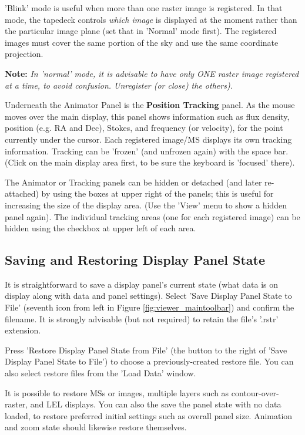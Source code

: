 'Blink' mode is useful when more than one raster image is
registered. In that mode, the tapedeck controls {\it which image} is
displayed at the moment rather than the particular image plane
(set that in 'Normal' mode first). The registered images must cover the
same portion of the sky and use the same coordinate projection.

{\bf Note:} {\em In 'normal' mode, it is advisable to have only ONE
raster image registered at a time, to avoid confusion. Unregister (or
close) the others).}

Underneath the Animator Panel is the {\bf Position Tracking} panel.  As
the mouse moves over the main display, this panel shows information such as
flux density, position (e.g. RA and Dec), Stokes, and frequency (or velocity),
for the point currently under the cursor.  Each registered image/MS displays
its own tracking information.  Tracking can be 'frozen' (and unfrozen again)
with the space bar.  (Click on the main display area first, to be sure the
keyboard is 'focused' there).

The Animator or Tracking panels can be hidden or detached (and later
re-attached) by using the boxes at upper right of the panels; this is
useful for increasing the size of the display area.  (Use the 'View'
menu to show a hidden panel again).  The individual tracking areas
(one for each registered image) can be hidden using the checkbox at
upper left of each area.


\subsection{Saving and Restoring Display Panel State}
\label{section:display.viewerGUI.save-restore}

It is straightforward to save a display panel's current state (what
data is on display along with data and panel settings).  Select 'Save Display
Panel State to File'
(seventh icon from left in Figure \ref{fig:viewer_maintoolbar})
and confirm the filename.  It is strongly
advisable (but not required) to retain the file's '.rstr' extension.  

Press 'Restore Display Panel State from File' (the button to the right
of 'Save Display Panel State to File') to
choose a previously-created restore file.  You can also select restore
files from the 'Load Data' window.

It is possible to restore MSs or images, multiple layers such as
contour-over-raster, and LEL displays.  You can also the save the panel
state with no data loaded, to restore preferred initial settings such
as overall panel size.  Animation and zoom state should
likewise restore themselves.

